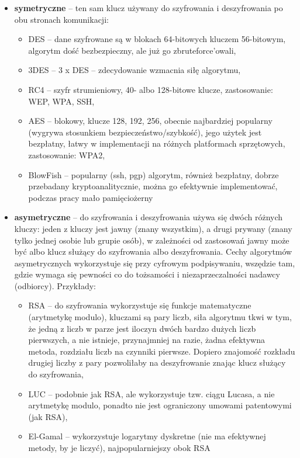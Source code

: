 \begin{itemize}
	\setlength\itemsep{1pt}
	\item \textbf{symetryczne} – ten sam klucz używany do szyfrowania i deszyfrowania po obu stronach komunikacji:
	\begin{itemize}
		\setlength\itemsep{1pt}
		\item DES – dane szyfrowane są w blokach 64-bitowych kluczem 56-bitowym, algorytm dość bezbezpieczny, ale już go zbruteforce’owali,
		\item 3DES – 3 x DES – zdecydowanie wzmacnia siłę algorytmu,
		\item RC4 – szyfr strumieniowy, 40- albo 128-bitowe klucze, zastosowanie: WEP, WPA, SSH,
		\item AES – blokowy, klucze 128, 192, 256, obecnie najbardziej popularny (wygrywa stosunkiem bezpieczeństwo/szybkość), jego użytek jest bezpłatny, łatwy w implementacji na różnych platformach sprzętowych, zastosowanie: WPA2,
		\item BlowFish – popularny (ssh, pgp) algorytm, również bezpłatny, dobrze przebadany kryptoanalitycznie, można go efektywnie implementować, podczas pracy mało pamięciożerny
	\end{itemize}
	\item \textbf{asymetryczne} – do szyfrowania i deszyfrowania używa się dwóch różnych kluczy: jeden z kluczy jest jawny (znany wszystkim), a drugi prywany (znany tylko jednej osobie lub grupie osób), w zależności od zastosowań jawny może być albo klucz służący do szyfrowania albo deszyfrowania. Cechy algorytmów asymetrycznych wykorzystuje się przy cyfrowym podpisywaniu, wszędzie tam, gdzie wymaga się pewności co do tożsamości i niezaprzeczalności nadawcy (odbiorcy). Przykłady:
	\begin{itemize}
		\setlength\itemsep{1pt}
		\item RSA – do szyfrowania wykorzystuje się funkcje matematyczne (arytmetykę modulo), kluczami są pary liczb, siła algorytmu tkwi w tym, że jedną z liczb w parze jest iloczyn dwóch bardzo dużych liczb pierwszych, a nie istnieje, przynajmniej na razie, żadna efektywna metoda, rozdziału liczb na czynniki pierwsze. Dopiero znajomość rozkładu drugiej liczby z pary pozwoliłaby na deszyfrowanie znając klucz służący do szyfrowania,
		\item LUC – podobnie jak RSA, ale wykorzystuje tzw. ciągu Lucasa, a nie arytmetykę modulo, ponadto nie jest ograniczony umowami patentowymi (jak RSA),
		\item El-Gamal – wykorzystuje logarytmy dyskretne (nie ma efektywnej metody, by je liczyć), najpopularniejszy obok RSA
	\end{itemize}
\end{itemize}

